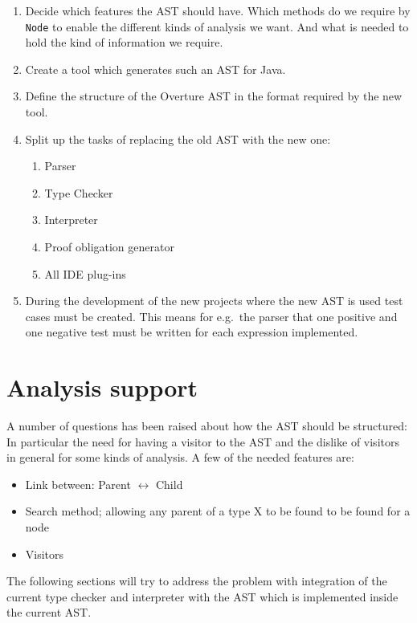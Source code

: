 \documentclass{overturerep}
\begin{document}
\begin{enumerate}

\item Decide which features the AST should have. Which methods do we require by \texttt{Node} to enable the different kinds of analysis we want. And what is needed to hold the kind of information we require.
\item Create a tool which generates such an AST for Java.
\item Define the structure of the Overture AST in the format required by the new tool.
\item Split up the tasks of replacing the old AST with the new one:
\begin{enumerate}
\item Parser
\item Type Checker
\item Interpreter
\item Proof obligation generator
\item All IDE plug-ins
\end{enumerate}
\item During the development of the new projects where the new AST is used test cases must be created. This means for e.g.\ the parser that one positive and one negative test must be written for each expression implemented.

\end{enumerate}



\section{Analysis support}
A number of questions has been raised about how the AST should be
structured: In particular the need for having a visitor to the AST and
the dislike of visitors in general for some kinds of analysis.
A few of the needed features are:
\begin{itemize}
\item Link between: Parent $\leftrightarrow$ Child
\item Search method; allowing any parent of a type X to be found to be found for a node
\item Visitors
\end{itemize}

The following sections will try to address the problem with integration of the current type checker and interpreter with the AST which is implemented inside the current AST.
\end{document}
